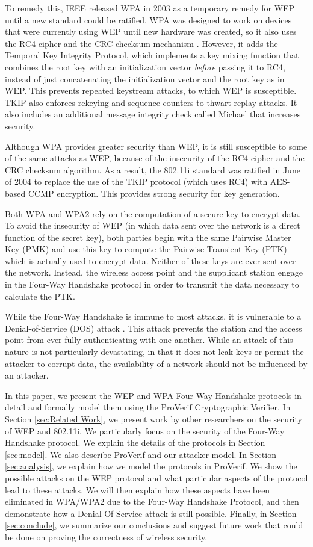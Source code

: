 \documentclass[11pt, twocolumn]{article} %
\begin{document}
To remedy this, IEEE released WPA in 2003 as a temporary remedy for WEP until a new standard could be ratified.  WPA was designed to work on devices that were currently using WEP until new hardware was created, so it also uses the RC4 cipher and the CRC checksum mechanism \cite{wpa03}.  However, it adds the Temporal Key Integrity Protocol, which implements a key mixing function that combines the root key with an initialization vector \textit{before} passing it to RC4, instead of just concatenating the initialization vector and the root key as in WEP.  This prevents repeated keystream attacks, to which WEP is susceptible.  TKIP also enforces rekeying and sequence counters to thwart replay attacks.  It also includes an additional message integrity check called Michael that increases security.  

Although WPA provides greater security than WEP, it is still susceptible to some of the same attacks as WEP, because of the insecurity of the RC4 cipher and the CRC checksum algorithm.  As a result, the 802.11i standard was ratified in June of 2004 to replace the use of the TKIP protocol (which uses RC4) with AES-based CCMP encryption\cite{IEEE802.11i}. This provides strong security for key generation.

Both WPA and WPA2 rely on the computation of a secure key to encrypt data.  To avoid the insecurity of WEP (in which data sent over the network is a direct function of the secret key), both parties begin with the same Pairwise Master Key (PMK) and use this key to compute the Pairwise Transient Key (PTK) which is actually used to encrypt data.  Neither of these keys are ever sent over the network.  Instead, the wireless access point and the supplicant station engage in the Four-Way Handshake protocol in order to transmit the data necessary to calculate the PTK.  

While the Four-Way Handshake is immune to most attacks, it is vulnerable to a Denial-of-Service (DOS) attack \cite{he05}.  This attack prevents the station and the access point from ever fully authenticating with one another.  While an attack of this nature is not particularly devastating, in that it does not leak keys or permit the attacker to corrupt data, the availability of a network should not be influenced by an attacker.

In this paper, we present the WEP and WPA Four-Way Handshake protocols in detail and formally model them using the ProVerif Cryptographic Verifier. In Section \ref{sec:Related Work}, we present work by other researchers on the security of WEP and 802.11i.  We particularly focus on the security of the Four-Way Handshake protocol.  We explain the details of the protocols in Section \ref{sec:model}.  We also describe ProVerif and our attacker model.  In Section \ref{sec:analysis}, we explain how we model the protocols in ProVerif.  We show the possible attacks on the WEP protocol and what particular aspects of the protocol lead to these attacks.  We will then explain how these aspects have been eliminated in WPA/WPA2 due to the Four-Way Handshake Protocol, and then demonstrate how a Denial-Of-Service attack is still possible.  Finally, in Section \ref{sec:conclude}, we summarize our conclusions and suggest future work that could be done on proving the correctness of wireless security.
\end{document}
